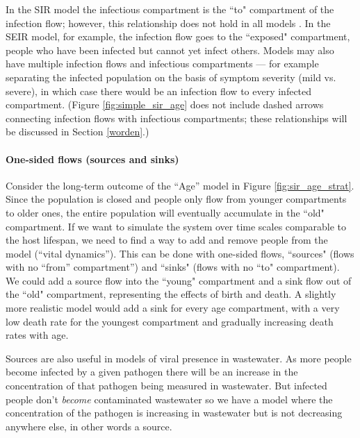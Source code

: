 In the SIR model the infectious compartment is the ``to" compartment of the infection flow; however, this relationship does not hold in all models .  In the SEIR model, for example, the infection flow goes to the ``exposed" compartment, people who have been infected but cannot yet infect others. Models may also have multiple infection flows and infectious compartments --- for example separating the infected population on the basis of symptom severity (mild vs. severe), in which case there would be an infection flow to every infected compartment. (Figure \ref{fig:simple_sir_age} does not include dashed arrows connecting infection flows with infectious compartments; these relationships will be discussed in Section \ref{worden}.)

\paragraph{One-sided flows (sources and sinks)}

Consider the long-term outcome of the ``Age'' model in Figure \ref{fig:sir_age_strat}. Since the population is closed and people only flow from younger compartments to older ones, the entire population will eventually accumulate in the ``old" compartment. If we want to simulate the system over time scales comparable to the host lifespan, we need to find a way to add and remove people from the model (``vital dynamics''). This can be done with one-sided flows, ``sources" (flows with no ``from'' compartment'') and ``sinks" (flows with no ``to" compartment). We could add a source flow into the ``young" compartment and a sink flow out of the ``old" compartment, representing the effects of birth and death. A slightly more realistic model would add a sink for every age compartment,  with a very low death rate for the youngest compartment and gradually increasing death rates with age.

Sources are also useful in models of viral presence in wastewater. As more people become infected by a given pathogen there will be an increase in the concentration of that pathogen being measured in wastewater.  But infected people don't \emph{become} contaminated wastewater so we have a model where the concentration of the pathogen is increasing in wastewater but is not decreasing anywhere else, in other words a source. 

